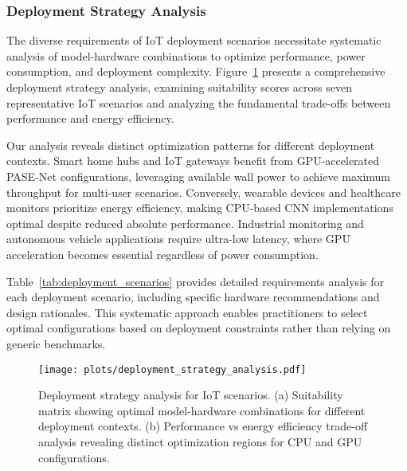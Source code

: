 \subsubsection{Deployment Strategy Analysis}

The diverse requirements of IoT deployment scenarios necessitate systematic analysis of model-hardware combinations to optimize performance, power consumption, and deployment complexity. Figure~\ref{fig:deployment_strategy} presents a comprehensive deployment strategy analysis, examining suitability scores across seven representative IoT scenarios and analyzing the fundamental trade-offs between performance and energy efficiency.

Our analysis reveals distinct optimization patterns for different deployment contexts. Smart home hubs and IoT gateways benefit from GPU-accelerated PASE-Net configurations, leveraging available wall power to achieve maximum throughput for multi-user scenarios. Conversely, wearable devices and healthcare monitors prioritize energy efficiency, making CPU-based CNN implementations optimal despite reduced absolute performance. Industrial monitoring and autonomous vehicle applications require ultra-low latency, where GPU acceleration becomes essential regardless of power consumption.

Table~\ref{tab:deployment_scenarios} provides detailed requirements analysis for each deployment scenario, including specific hardware recommendations and design rationales. This systematic approach enables practitioners to select optimal configurations based on deployment constraints rather than relying on generic benchmarks.

\begin{figure}[t]
\centering
\texttt{[image: plots/deployment\_strategy\_analysis.pdf]}
\caption{Deployment strategy analysis for IoT scenarios. (a) Suitability matrix showing optimal model-hardware combinations for different deployment contexts. (b) Performance vs energy efficiency trade-off analysis revealing distinct optimization regions for CPU and GPU configurations.}
\label{fig:deployment_strategy}
\end{figure}

